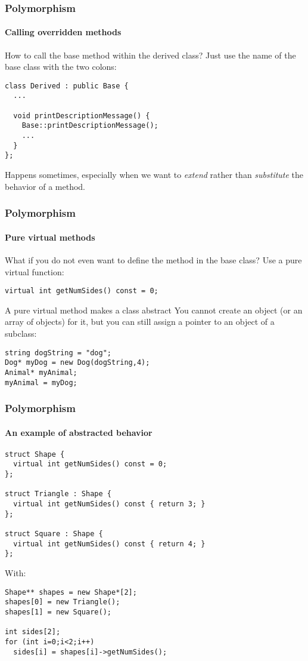 \begin{frame}[fragile]
\frametitle{Polymorphism}
\framesubtitle{Calling overridden methods}

\begin{block}{How to call the base method within the derived class?}
Just use the name of the base class with the two colons:
{\scriptsize 
\begin{verbatim}
class Derived : public Base {
  ...
  
  void printDescriptionMessage() {
    Base::printDescriptionMessage();
    ...
  }
};
\end{verbatim}
}
Happens sometimes, especially when we want to {\em extend} rather than {\em substitute} the behavior of a method.
\end{block}


\end{frame}

\begin{frame}[fragile]
\frametitle{Polymorphism}
\framesubtitle{Pure virtual methods}

\begin{block}{What if you do not even want to define the method in the base class?}
Use a pure virtual function:

{\scriptsize 
\texttt{virtual int getNumSides() const = 0; }
}
\end{block}
\pause
\begin{block}{A pure virtual method makes a class abstract}
You cannot create an object (or an array of objects) for it, but you can still assign a pointer to an object of a subclass:

{\scriptsize 
\begin{verbatim}
string dogString = "dog";
Dog* myDog = new Dog(dogString,4);
Animal* myAnimal;
myAnimal = myDog;
\end{verbatim}
}

\end{block}

\end{frame}

\begin{frame}[fragile]
\frametitle{Polymorphism}
\framesubtitle{An example of abstracted behavior}
{\scriptsize 
\begin{verbatim}
struct Shape {
  virtual int getNumSides() const = 0;
};

struct Triangle : Shape {
  virtual int getNumSides() const { return 3; }
};

struct Square : Shape {
  virtual int getNumSides() const { return 4; }
};
\end{verbatim}
}
With:
{\scriptsize 
\begin{verbatim}
Shape** shapes = new Shape*[2];
shapes[0] = new Triangle();
shapes[1] = new Square();
  
int sides[2];
for (int i=0;i<2;i++)
  sides[i] = shapes[i]->getNumSides();
\end{verbatim}
}
\end{frame}

